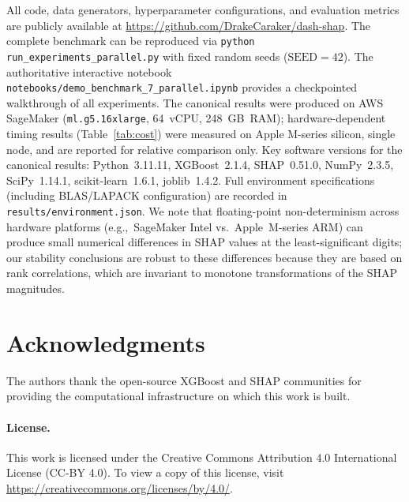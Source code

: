 \documentclass[11pt]{article}
\newcommand{\eg}{e.g.,\ }
\begin{document}
All code, data generators, hyperparameter configurations, and evaluation
metrics are publicly available at
\url{https://github.com/DrakeCaraker/dash-shap}. The complete benchmark
can be reproduced via \texttt{python run\_experiments\_parallel.py} with fixed
random seeds ($\text{SEED} = 42$). The authoritative interactive
notebook \texttt{notebooks/demo\_benchmark\_7\_parallel.ipynb} provides a
checkpointed walkthrough of all experiments. The canonical results were
produced on AWS SageMaker (\texttt{ml.g5.16xlarge}, 64~vCPU, 248~GB~RAM);
hardware-dependent timing results (Table~\ref{tab:cost}) were measured on
Apple M-series silicon, single node, and are reported for relative
comparison only.  Key software versions for the canonical results:
Python~3.11.11, XGBoost~2.1.4, SHAP~0.51.0, NumPy~2.3.5,
SciPy~1.14.1, scikit-learn~1.6.1, joblib~1.4.2.  Full environment
specifications (including BLAS/LAPACK configuration) are recorded in
\texttt{results/environment.json}.  We note that floating-point
non-determinism across hardware platforms (\eg SageMaker Intel vs.\
Apple~M-series ARM) can produce small numerical differences in SHAP
values at the least-significant digits; our stability conclusions are
robust to these differences because they are based on rank
correlations, which are invariant to monotone transformations of the
SHAP magnitudes.

\section*{Acknowledgments}

The authors thank the open-source XGBoost and SHAP communities for
providing the computational infrastructure on which this work is built.

\paragraph{License.}
This work is licensed under the Creative Commons Attribution 4.0
International License (CC-BY 4.0). To view a copy of this license, visit
\url{https://creativecommons.org/licenses/by/4.0/}.



% 
\end{document}

